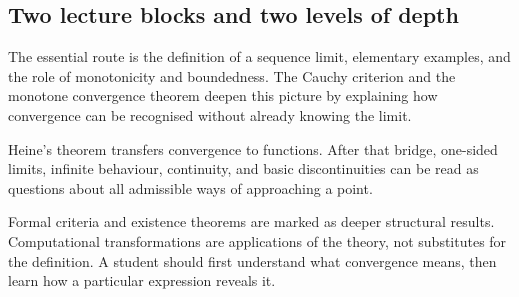 \subsection{Two lecture blocks and two levels of depth}

\begin{corebox}
The essential route is the definition of a sequence limit, elementary examples, and the role of monotonicity and boundedness. The Cauchy criterion and the monotone convergence theorem deepen this picture by explaining how convergence can be recognised without already knowing the limit.
\end{corebox}

\begin{corebox}
Heine's theorem transfers convergence to functions. After that bridge, one-sided limits, infinite behaviour, continuity, and basic discontinuities can be read as questions about all admissible ways of approaching a point.
\end{corebox}

Formal criteria and existence theorems are marked as deeper structural results. Computational transformations are applications of the theory, not substitutes for the definition. A student should first understand what convergence means, then learn how a particular expression reveals it.

